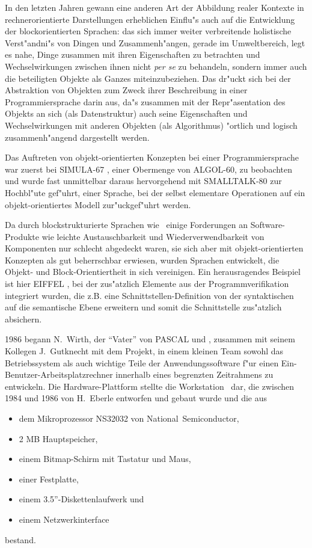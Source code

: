 In den letzten Jahren gewann eine anderen Art der Abbildung realer Kontexte
in rechnerorientierte Darstellungen erheblichen Einflu"s auch auf die Entwicklung
der blockorientierten Sprachen: das sich immer weiter verbreitende holistische
Verst"andni"s von Dingen und Zusammenh"angen, gerade im Umweltbereich, legt es nahe,
Dinge zusammen mit ihren Eigenschaften zu betrachten und Wechselwirkungen zwischen
ihnen nicht {\it per se\/} zu behandeln, sondern immer auch die beteiligten
Objekte als Ganzes miteinzubeziehen.
Das dr"uckt sich bei der Abstraktion von Objekten zum Zweck ihrer Beschreibung
in einer Programmiersprache darin aus, da"s zusammen mit der Repr"asentation
des Objekts an sich (als Datenstruktur) auch seine Eigenschaften und Wechselwirkungen
mit anderen Objekten (als Algorithmus) "ortlich und logisch zusammenh"angend
dargestellt werden.

Das Auftreten von objekt-orientierten Konzepten bei einer Programmiersprache
war zuerst bei \hbox{SIMULA-67} \cite{simula-67}, einer Obermenge von
\hbox{ALGOL-60}, zu beobachten und wurde fast unmittelbar daraus hervorgehend
mit \hbox{SMALLTALK-80} zur Hochbl"ute gef"uhrt, einer Sprache, bei der selbst
elementare Operationen auf ein objekt-orientiertes Modell zur"uckgef"uhrt werden.

Da durch blockstrukturierte Sprachen wie \modula\ einige Forderungen
an Software-Produkte wie leichte Austauschbarkeit und Wiederverwendbarkeit
von Komponenten nur schlecht abgedeckt waren, sie sich aber mit
objekt-orientierten Konzepten als gut beherrschbar erwiesen, wurden Sprachen
entwickelt, die Objekt- und Block-Orientiertheit in sich vereinigen.
Ein herausragendes Beispiel ist hier \hbox{EIFFEL} \cite{eiffel}, bei der
zus"atzlich Elemente aus der Programmverifikation integriert wurden, die z.B.
eine Schnittstellen-Definition von der syntaktischen auf die semantische
Ebene erweitern und somit die Schnittstelle zus"atzlich absichern.
\thrend

1986 begann N.~Wirth, der "`Vater"' von \hbox{PASCAL} und \modula,
zusammen mit seinem Kollegen J.~Gutknecht mit dem
Projekt, in einem kleinen Team sowohl das Betriebssystem als auch
wichtige Teile der Anwendungssoftware f"ur einen Ein-Benutzer-Arbeitsplatzrechner
innerhalb eines begrenzten Zeitrahmens zu entwickeln.
Die Hardware-Plattform stellte die Workstation \ceres\ dar,
die zwischen 1984 und 1986 von H.~Eberle entworfen und gebaut wurde und
die aus
\begin{itemize}
\item dem Mikroprozessor NS32032 von National~Semiconductor,
\item 2 MB Hauptspeicher,
\item einem Bitmap-Schirm mit Tastatur und Maus,
\item einer Festplatte,
\item einem 3.5''-Diskettenlaufwerk und
\item einem Netzwerkinterface
\end{itemize}
bestand.

